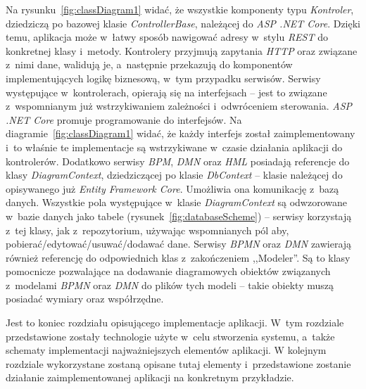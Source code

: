 Na rysunku~\ref{fig:classDiagram1} widać, że wszystkie komponenty typu \emph{Kontroler}, dziedziczą po bazowej klasie \emph{ControllerBase}, należącej do \emph{ASP .NET Core}. Dzięki temu, aplikacja może w~łatwy sposób nawigować adresy w~stylu \emph{REST} do konkretnej klasy i~metody. Kontrolery przyjmują zapytania \emph{HTTP} oraz związane z~nimi dane, walidują je, a~następnie przekazują do komponentów implementujących logikę biznesową, w~tym przypadku serwisów. Serwisy występujące w~kontrolerach, opierają się na interfejsach -- jest to związane z~wspomnianym już wstrzykiwaniem zależności i~odwróceniem sterowania. \emph{ASP .NET Core} promuje programowanie do interfejsów. Na diagramie~\ref{fig:classDiagram1} widać, że każdy interfejs został zaimplementowany i~to właśnie te implementacje są wstrzykiwane w~czasie działania aplikacji do kontrolerów. Dodatkowo serwisy \emph{BPM}, \emph{DMN} oraz \emph{HML} posiadają referencje do klasy \emph{DiagramContext}, dziedziczącej po klasie \emph{DbContext} -- klasie należącej do opisywanego już \emph{Entity Framework Core}. Umożliwia ona komunikację z~bazą danych. Wszystkie pola występujące w~klasie \emph{DiagramContext} są odwzorowane w~bazie danych jako tabele (rysunek~\ref{fig:databaseScheme}) -- serwisy korzystają z~tej klasy, jak z~repozytorium, używając wspomnianych pól aby, pobierać/edytować/usuwać/dodawać dane. Serwisy \emph{BPMN} oraz \emph{DMN} zawierają również referencję do odpowiednich klas z~zakończeniem ,,Modeler''. Są to klasy pomocnicze pozwalające na dodawanie diagramowych obiektów związanych z~modelami \emph{BPMN} oraz \emph{DMN} do plików tych modeli -- takie obiekty muszą posiadać wymiary oraz współrzędne.
\vspace{1cm}

Jest to koniec rozdziału opisującego implementacje aplikacji. W~tym rozdziale przedstawione zostały technologie użyte w~celu stworzenia systemu, a~także schematy implementacji najważniejszych elementów aplikacji. W kolejnym rozdziale wykorzystane zostaną opisane tutaj elementy i~przedstawione zostanie działanie zaimplementowanej aplikacji na konkretnym przykładzie.




